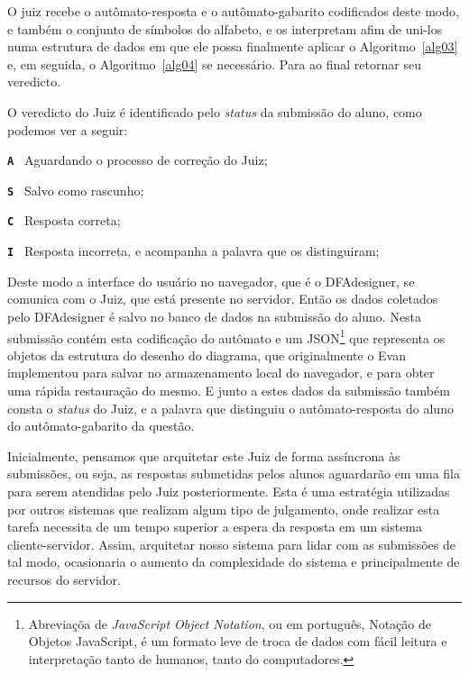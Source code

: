 \documentclass[
	12pt,				%
	openany,
	oneside,
	a4paper,			%
	english,			%
	brazil				%
	]{abntex2}
\begin{document}
  O juiz recebe o autômato-resposta e o autômato-gabarito codificados deste modo, e também o conjunto de símbolos do alfabeto, e os interpretam afim de uni-los numa estrutura de dados em que ele possa finalmente aplicar o Algoritmo~\ref{alg03} e, em seguida, o Algoritmo~\ref{alg04} se necessário. Para ao final retornar seu veredicto.

  O veredicto do Juiz é identificado pelo \textit{status} da submissão do aluno, como podemos ver a seguir:

 \begin{alineas}
  \item[\textbf{\texttt{A  }}] Aguardando o processo de correção do Juiz;
  \item[\textbf{\texttt{S  }}] Salvo como rascunho;
  \item[\textbf{\texttt{C  }}] Resposta correta;
  \item[\textbf{\texttt{I  }}] Resposta incorreta, e acompanha a palavra que os distinguiram;
\end{alineas}

  Deste modo a interface do usuário no navegador, que é o DFAdesigner, se comunica com o Juiz, que está presente no servidor. Então os dados coletados pelo DFAdesigner é salvo no banco de dados na submissão do aluno. Nesta submissão contém esta codificação do autômato e um JSON\footnote{Abreviaçõa de \textit{JavaScript Object Notation}, ou em português, Notação de Objetos JavaScript, é um formato leve de troca de dados com fácil leitura e interpretação tanto de humanos, tanto do computadores.} que representa os objetos da estrutura do desenho do diagrama, que originalmente o Evan implementou para salvar no armazenamento local do navegador, e para obter uma rápida restauração do mesmo. E junto a estes dados da submissão também consta o \textit{status} do Juiz, e a palavra que distinguiu o autômato-resposta do aluno do autômato-gabarito da questão.
  
  Inicialmente, pensamos que arquitetar este Juiz de forma assíncrona às submissões, ou seja, as respostas submetidas pelos alunos aguardarão em uma fila para serem atendidas pelo Juiz posteriormente. Esta é uma estratégia utilizadas por outros sistemas que realizam algum tipo de julgamento, onde realizar esta tarefa necessita de um tempo superior a espera da resposta em um sistema cliente-servidor. Assim, arquitetar nosso sistema para lidar com as submissões de tal modo, ocasionaria o aumento da complexidade do sistema e principalmente de recursos do servidor. 
  
\end{document}
